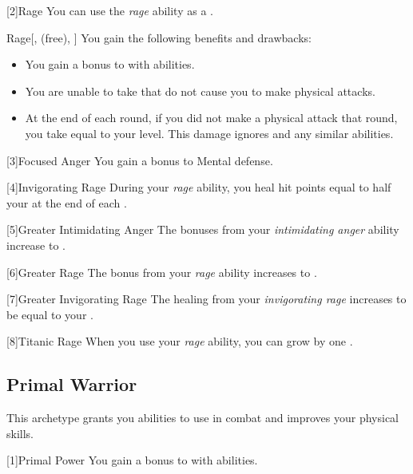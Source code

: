         [2]{Rage} You can use the \textit{rage} ability as a .
        \begin{apability}{Rage}[,  (free), ]
            You gain the following benefits and drawbacks:
            \begin{itemize}
                \item You gain a  bonus to  with  abilities.
                \item You are unable to take  that do not cause you to make physical attacks.
                \item At the end of each round, if you did not make a physical attack that round, you take  equal to your level.
                    This damage ignores  and any similar abilities.
            \end{itemize}
        \end{apability}

        [3]{Focused Anger} You gain a  bonus to Mental defense.

        [4]{Invigorating Rage} During your \textit{rage} ability, you heal hit points equal to half your  at the end of each .

        [5]{Greater Intimidating Anger}
        The bonuses from your \textit{intimidating anger} ability increase to .

        [6]{Greater Rage} The  bonus from your \textit{rage} ability increases to .

        [7]{Greater Invigorating Rage} The healing from your \textit{invigorating rage} increases to be equal to your .

        [8]{Titanic Rage}
        When you use your \textit{rage} ability, you can grow by one .

    \subsection{Primal Warrior}
        This archetype grants you abilities to use in combat and improves your physical skills.

        [1]{Primal Power} You gain a  bonus to  with  abilities.

